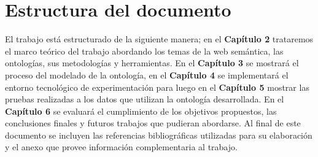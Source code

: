 \section{Estructura del documento}
El trabajo está estructurado de la siguiente manera; en el \textbf{Capítulo 2} trataremos el marco teórico del trabajo abordando los temas de la web semántica, las ontologías, sus metodologías y herramientas. En el\textbf{ Capítulo 3 }se mostrará el proceso del modelado de la ontología, en el \textbf{Capítulo 4} se implementará el entorno tecnológico de experimentación para luego en el \textbf{Capítulo 5 }mostrar las pruebas realizadas a los datos que utilizan la ontología desarrollada. En el \textbf{Capítulo 6 }se evaluará el cumplimiento de los objetivos propuestos, las conclusiones finales y futuros trabajos que pudieran abordarse. Al final de este documento  se  incluyen las referencias bibliográficas utilizadas para su elaboración y el anexo que provee información complementaria al trabajo.


